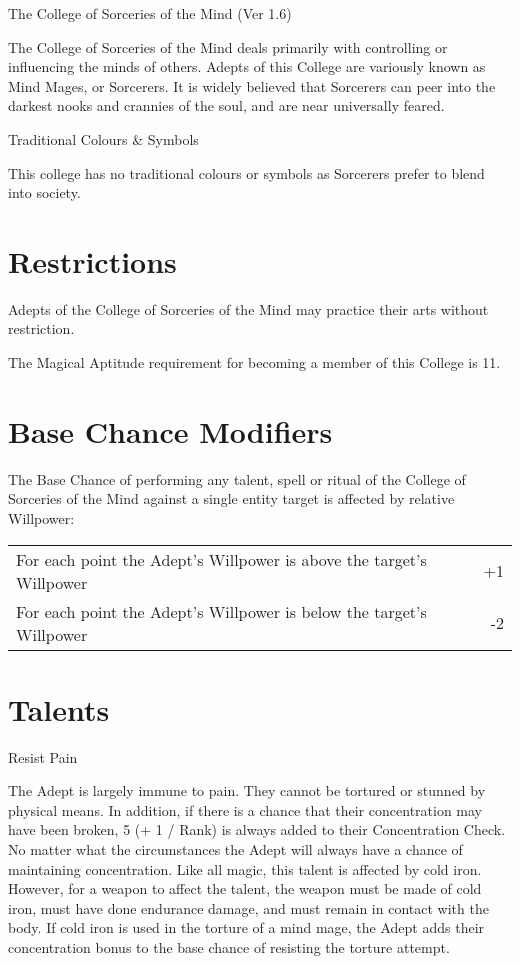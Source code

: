 \begin{Chapter}{The College of Sorceries of the Mind (Ver 1.6)}

The College of Sorceries of the Mind deals primarily with controlling
or influencing the minds of others. Adepts of this College are
variously known as Mind Mages, or Sorcerers. It is widely believed
that Sorcerers can peer into the darkest nooks and crannies of the
soul, and are near universally feared.

Traditional Colours \& Symbols  

This college has no traditional colours or symbols as Sorcerers prefer
to blend into society.

\section{Restrictions}

Adepts of the College of Sorceries of the Mind may practice their arts
without restriction.

The Magical Aptitude requirement for becoming a member of this College
is 11.

\section{Base Chance Modifiers}

The Base Chance of performing any talent, spell or ritual of the
College of Sorceries of the Mind against a single entity target is
affected by relative Willpower:

\begin{tabularx}{\columnwidth}{Xr}
For each point the Adept’s Willpower is above the target’s Willpower & +1 \\
For each point the Adept’s Willpower is below the target’s Willpower & -2 \\
\end{tabularx}

\section{Talents }

\begin{talent}[T-1]{Resist Pain }

\begin{effects}
The Adept is largely immune to pain. They cannot be tortured or
stunned by physical means.  In addition, if there is a chance that
their concentration may have been broken, 5 (+ 1 / Rank) is always
added to their Concentration Check.  No matter what the circumstances
the Adept will always have a chance of maintaining concentration.
Like all magic, this talent is affected by cold iron.  However, for a
weapon to affect the talent, the weapon must be made of cold iron,
must have done endurance damage, and must remain in contact with the
body. If cold iron is used in the torture of a mind mage, the Adept
adds their concentration bonus to the base chance of resisting the
torture attempt.
\end{effects}
\end{talent}


\end{Chapter}
